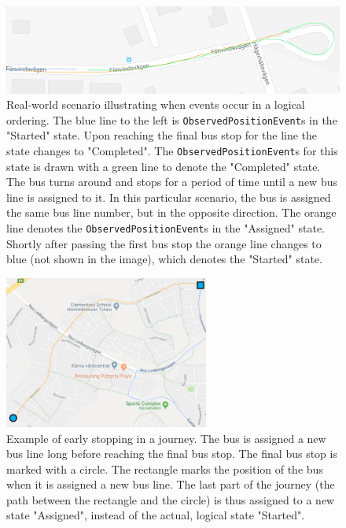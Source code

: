 \begin{figure}[t]
    \centering
    \includegraphics[width=1\textwidth]{figures/assigned_completed_working}
    \caption[Real-world scenario illustrating when events occur in a logical ordering]
    {\small Real-world scenario illustrating when events occur in a logical ordering.
    The blue line to the left is \texttt{ObservedPositionEvent}s in the "Started" state.
    Upon reaching the final bus stop for the line the state changes to "Completed".
    The \texttt{ObservedPositionEvent}s for this state is drawn with a green line to denote the "Completed" state.
    The bus turns around and stops for a period of time until a new bus line is assigned to it.
    In this particular scenario, the bus is assigned the same bus line number, but in the opposite direction.
    The orange line denotes the \texttt{ObservedPositionEvent}s in the "Assigned" state.
    Shortly after passing the first bus stop the orange line changes to blue (not shown in the image), which denotes the "Started" state.}
    \label{fig:assigned-before-completed-working}
\end{figure}

\begin{figure}[t]
    \centering
    \includegraphics[width=0.6\textwidth]{figures/assigned_completed_problem_long}
    \caption[Example of early stopping in a journey]
    {\small Example of early stopping in a journey.
    The bus is assigned a new bus line long before reaching the final bus stop.
    The final bus stop is marked with a circle.
    The rectangle marks the position of the bus when it is assigned a new bus line.
    The last part of the journey (the path between the rectangle and the circle) is thus assigned to a new state "Assigned", instead of the actual, logical state "Started".}
    \label{fig:assigned-before-completed-long}
\end{figure}

